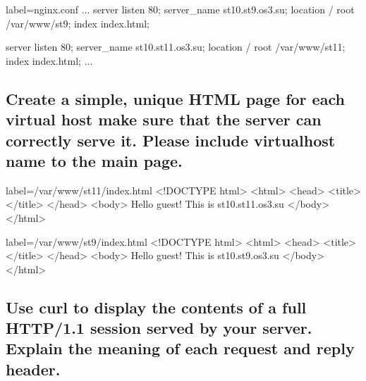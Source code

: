 \documentclass[a4paper,11pt]{article}
\begin{document}
\begin{nginxcode*}{label=nginx.conf}
...
    server {
        listen  80;
        server_name     st10.st9.os3.su;
        location        / {
                root    /var/www/st9;
                index   index.html;
        }
    }

    server {
        listen  80;
        server_name     st10.st11.os3.su;
        location        / {
                root    /var/www/st11;
                index   index.html;
        }
    }
...
\end{nginxcode*}

\subsection{Create a simple, unique HTML page for each virtual host make sure that the server can correctly serve it. Please include virtualhost name to the main page.}

\begin{htmlcode*}{label=/var/www/st11/index.html}
<!DOCTYPE html>
<html>
<head>
  <title></title>
</head>
<body>
  Hello guest! This is st10.st11.os3.su
</body>
</html>
\end{htmlcode*}

\begin{htmlcode*}{label=/var/www/st9/index.html}
<!DOCTYPE html>
<html>
<head>
  <title></title>
</head>
<body>
  Hello guest! This is st10.st9.os3.su
</body>
</html>
\end{htmlcode*}


\subsection{Use curl to display the contents of a full HTTP/1.1 session served by your server. Explain the meaning of each request and reply header.
}
\end{document}
